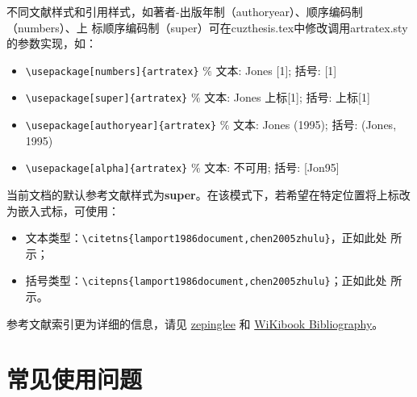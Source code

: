 不同文献样式和引用样式，如著者-出版年制（authoryear）、顺序编码制（numbers）、上
标顺序编码制（super）可在cuzthesis.tex中修改调用artratex.sty的参数实现，如：
\begin{itemize}
    \item \verb+\usepackage[numbers]{artratex}+ $\%$ 文本: Jones [1]; 括号: [1]
    \item \verb+\usepackage[super]{artratex}+ $\%$ 文本: Jones 上标[1]; 括号: 上标[1]
    \item \verb+\usepackage[authoryear]{artratex}+ $\%$ 文本: Jones (1995); 括号: (Jones, 1995)
    \item \verb+\usepackage[alpha]{artratex}+ $\%$ 文本: 不可用; 括号: [Jon95]
\end{itemize}

当前文档的默认参考文献样式为\textbf{super}。在该模式下，若希望在特定位置将上标改
为嵌入式标，可使用：

\begin{itemize}
    \item 文本类型：\verb|\citetns{lamport1986document,chen2005zhulu}|，正如此处
    所示；
    \item 括号类型：\verb|\citepns{lamport1986document,chen2005zhulu}|；正如此处
    所示。
\end{itemize}

参考文献索引更为详细的信息，请见
\href{https://github.com/zepinglee/gbt7714-bibtex-style}{zepinglee} 和
\href{https://en.wikibooks.org/wiki/LaTeX/Bibliography_Management}{WiKibook
Bibliography}。

\nocite{*}

\section{常见使用问题}\label{sec:qa}

